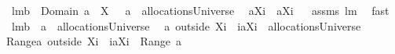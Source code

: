 \begin{isabellebody}
\isamarkupfalse%
%
\endisatagproof
{\isafoldproof}%
%
\isadelimproof
%
\endisadelimproof
\isanewline
\isanewline
{}\isamarkupfalse%
\ lm{}{}b{\isacharcolon}\ \ {\isachardoublequoteopen}Domain\ a\ {\isasyminter}\ X\ {\isasymnoteq}\ {\isacharbraceleft}{\isacharbraceright}{\isachardoublequoteclose}\ {\isachardoublequoteopen}a\ {\isasymin}\ allocationsUniverse{\isachardoublequoteclose}\ \ \isanewline
{\isachardoublequoteopen}{\isacharbraceleft}{\isasymUnion}{\isacharparenleft}a{\isacharbackquote}{\isacharbackquote}{\isacharparenleft}X{\isasymunion}{\isacharbraceleft}i{\isacharbraceright}{\isacharparenright}{\isacharparenright}{\isacharbraceright}{\isacharminus}{\isacharbraceleft}{\isacharbraceleft}{\isacharbraceright}{\isacharbraceright}\ {\isacharequal}\ {\isacharbraceleft}{\isasymUnion}{\isacharparenleft}a{\isacharbackquote}{\isacharbackquote}{\isacharparenleft}X{\isasymunion}{\isacharbraceleft}i{\isacharbraceright}{\isacharparenright}{\isacharparenright}{\isacharbraceright}{\isachardoublequoteclose}%
\isadelimproof
\ %
\endisadelimproof
%
\isatagproof
{}\isamarkupfalse%
\ assms\ lm{}{}\ \isamarkupfalse%
\ fast%
\endisatagproof
{\isafoldproof}%
%
\isadelimproof
%
\endisadelimproof
\isanewline
\isanewline
{}\isamarkupfalse%
\ lm{}{}b{\isacharcolon}\ \ {\isachardoublequoteopen}a\ {\isasymin}\ allocationsUniverse{\isachardoublequoteclose}\ \ \isanewline
{\isachardoublequoteopen}{\isacharparenleft}a\ outside\ {\isacharparenleft}X{\isasymunion}{\isacharbraceleft}i{\isacharbraceright}{\isacharparenright}{\isacharparenright}\ {\isasymunion}\ {\isacharparenleft}{\isacharbraceleft}i{\isacharbraceright}{\isasymtimes}{\isacharparenleft}{\isacharbraceleft}{\isasymUnion}{\isacharparenleft}a{\isacharbackquote}{\isacharbackquote}{\isacharparenleft}X{\isasymunion}{\isacharbraceleft}i{\isacharbraceright}{\isacharparenright}{\isacharparenright}{\isacharbraceright}{\isacharminus}{\isacharbraceleft}{\isacharbraceleft}{\isacharbraceright}{\isacharbraceright}{\isacharparenright}{\isacharparenright}\ {\isasymin}\ allocationsUniverse\ {\isacharampersand}\ \isanewline
{\isasymUnion}{\isacharparenleft}Range{\isacharparenleft}{\isacharparenleft}a\ outside\ {\isacharparenleft}X{\isasymunion}{\isacharbraceleft}i{\isacharbraceright}{\isacharparenright}{\isacharparenright}\ {\isasymunion}\ {\isacharparenleft}{\isacharbraceleft}i{\isacharbraceright}{\isasymtimes}{\isacharparenleft}{\isacharbraceleft}{\isasymUnion}{\isacharparenleft}a{\isacharbackquote}{\isacharbackquote}{\isacharparenleft}X{\isasymunion}{\isacharbraceleft}i{\isacharbraceright}{\isacharparenright}{\isacharparenright}{\isacharbraceright}{\isacharminus}{\isacharbraceleft}{\isacharbraceleft}{\isacharbraceright}{\isacharbraceright}{\isacharparenright}{\isacharparenright}{\isacharparenright}{\isacharparenright}\ {\isacharequal}\ {\isasymUnion}{\isacharparenleft}Range\ a{\isacharparenright}{\isachardoublequoteclose}\isanewline

\end{isabellebody}
